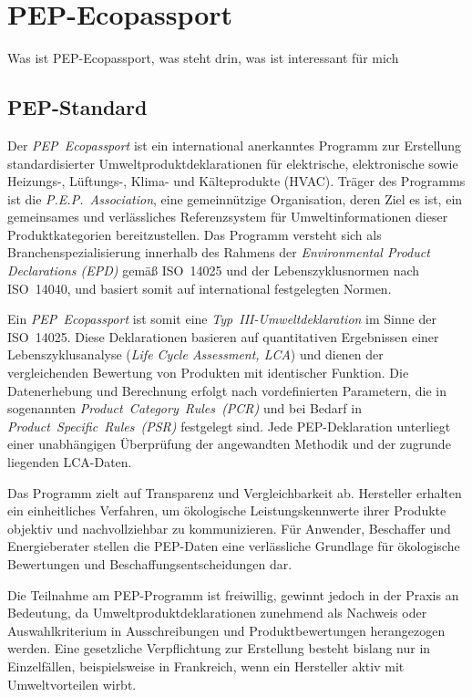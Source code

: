 \section{PEP-Ecopassport}
Was ist PEP-Ecopassport, was steht drin, was ist interessant für mich

\subsection{PEP-Standard}

Der \emph{PEP~Ecopassport\textsuperscript{\textregistered}} ist ein international anerkanntes Programm zur Erstellung standardisierter Umweltproduktdeklarationen für elektrische, 
elektronische sowie Heizungs-, Lüftungs-, Klima- und Kälteprodukte (HVAC). Träger des Programms ist die \emph{P.E.P.~Association}, eine gemeinnützige
Organisation, deren Ziel es ist, ein gemeinsames und verlässliches Referenzsystem für Umweltinformationen dieser Produktkategorien bereitzustellen. 
Das Programm versteht sich als Branchenspezialisierung innerhalb des Rahmens der \emph{Environmental Product Declarations (EPD)} gemäß ISO~14025 und der 
Lebenszyklusnormen nach ISO~14040, und basiert somit auf international festgelegten Normen. \cite{PEP}

Ein \emph{PEP~Ecopassport} ist somit eine \emph{Typ~III-Umweltdeklaration} im Sinne der ISO~14025. Diese Deklarationen basieren auf quantitativen Ergebnissen einer
Lebenszyklusanalyse (\emph{Life Cycle Assessment, LCA}) und dienen der vergleichenden Bewertung von Produkten mit identischer Funktion. 
Die Datenerhebung und Berechnung erfolgt nach vordefinierten Parametern, die in sogenannten \emph{Product~Category~Rules~(PCR)} und bei Bedarf in 
\emph{Product~Specific~Rules~(PSR)} festgelegt sind. Jede PEP-Deklaration unterliegt einer unabhängigen Überprüfung der angewandten Methodik und der zugrunde liegenden LCA-Daten. \cite{PEP}

Das Programm zielt auf Transparenz und Vergleichbarkeit ab. Hersteller erhalten ein einheitliches Verfahren, um ökologische Leistungskennwerte ihrer 
Produkte objektiv und nachvollziehbar zu kommunizieren. Für Anwender, Beschaffer und Energieberater stellen die PEP-Daten eine 
verlässliche Grundlage für ökologische Bewertungen und Beschaffungsentscheidungen dar.

Die Teilnahme am PEP-Programm ist freiwillig, gewinnt jedoch in der Praxis an Bedeutung, da Umweltproduktdeklarationen zunehmend als Nachweis 
oder Auswahlkriterium in Ausschreibungen und Produktbewertungen herangezogen werden. Eine gesetzliche Verpflichtung zur Erstellung besteht bislang nur in Einzelfällen, 
beispielsweise in Frankreich, wenn ein Hersteller aktiv mit Umweltvorteilen wirbt.

